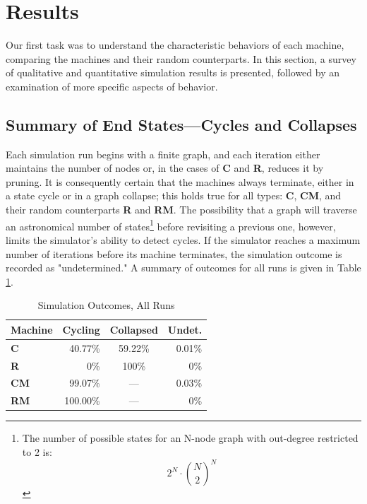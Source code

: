 \documentclass{tufte-handout}
\begin{document}

\section{Results}

Our first task was to understand the characteristic behaviors of each
machine, comparing the machines and their random counterparts.
In this section, a survey of qualitative and quantitative simulation results is
presented, followed by an examination of more specific aspects of behavior.

\subsection{Summary of End States---Cycles and Collapses}

Each simulation run begins with a finite graph, and each iteration
either maintains the number of nodes or, in the cases of \textbf{C} and \textbf{R},
reduces it by pruning.  It is consequently certain that the machines always terminate,
either in a state cycle or in a graph collapse; this holds true
for all types: \textbf{C}, \textbf{CM}, and their random counterparts \textbf{R} and \textbf{RM}.
The possibility that a graph will traverse an astronomical number
of states\footnote{The number of possible states for an N-node graph with
out-degree restricted to 2 is:
\[
2^N\cdot\binom{N}{2}^N
\]
}
before revisiting a previous one, however, limits the simulator's ability to
detect cycles. If the simulator reaches a maximum number of iterations
before its machine terminates, the simulation outcome is recorded as "undetermined."
A summary of outcomes for all runs is given in Table \ref{tab:Tab2}.

\begin{table}
\caption{Simulation Outcomes, All Runs}
\centering
\begin{tabular}{lrcr}
\toprule
Machine & Cycling & Collapsed & Undet. \\
\midrule
\textbf{C} & 40.77\% & 59.22\% & 0.01\% \\
\textbf{R} & 0\% & 100\% & 0\% \\
\cmidrule(r){2-4}
\textbf{CM} & 99.07\% & --- & 0.03\% \\
\textbf{RM} & 100.00\% & --- & 0\% \\
\bottomrule
\end{tabular}
\label{tab:Tab2}
\end{table}
\vspace{3mm}
\end{document}
